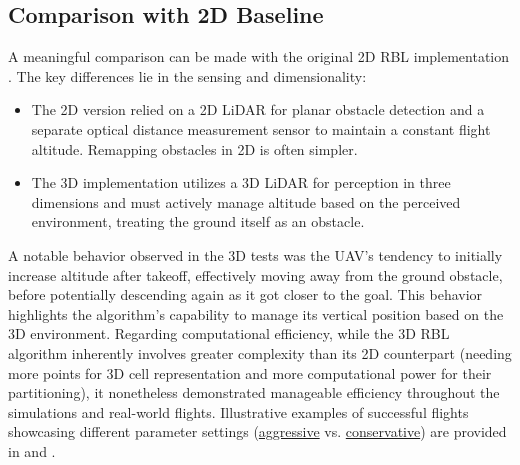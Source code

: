             \subsection{Comparison with 2D Baseline}
                A meaningful comparison can be made with the original 2D RBL implementation \cite{rbl_paper}. 
                The key differences lie in the sensing and dimensionality:
                \begin{itemize}
                    \item The 2D version relied on a 2D \ac{LiDAR} for planar obstacle detection and a separate optical distance measurement sensor to maintain a constant flight altitude. 
                    Remapping obstacles in 2D is often simpler.
                    \item The 3D implementation utilizes a 3D \ac{LiDAR} for perception in three dimensions and must actively manage altitude based on the perceived environment, treating the ground itself as an obstacle.
                \end{itemize}
                A notable behavior observed in the 3D tests was the \ac{UAV}'s tendency to initially increase altitude after takeoff, effectively moving away from the ground obstacle, before potentially descending again as it got closer to the goal. 
                This behavior highlights the algorithm's capability to manage its vertical position based on the 3D environment.
                Regarding computational efficiency, while the 3D \ac{RBL} algorithm inherently involves greater complexity than its 2D counterpart (needing more points for 3D cell representation and more computational power for their partitioning), it nonetheless demonstrated manageable efficiency throughout the simulations and real-world flights.
                Illustrative examples of successful flights showcasing different parameter settings (\href{https://www.youtube.com/watch?v=DFt222gnA_w&ab_channel=MichalKamler}{aggressive} vs. \href{https://www.youtube.com/watch?v=AJPk0yVCPUo&ab_channel=MichalKamler}{conservative}) are provided in \cite{aggressive_flight} and \cite{conservative_flight}.

